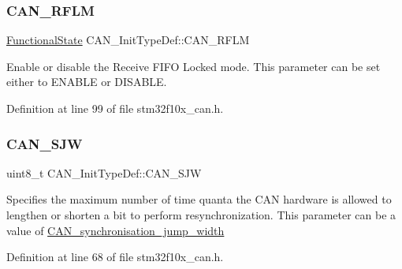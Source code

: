 \mbox{\label{struct_c_a_n___init_type_def_aa63787683c0ad533b513fb60355d76f1}} 
\subsubsection{\texorpdfstring{C\+A\+N\+\_\+\+R\+F\+LM}{CAN\_RFLM}}
{\footnotesize\ttfamily \hyperlink{group___exported__types_gac9a7e9a35d2513ec15c3b537aaa4fba1}{Functional\+State} C\+A\+N\+\_\+\+Init\+Type\+Def\+::\+C\+A\+N\+\_\+\+R\+F\+LM}

Enable or disable the Receive F\+I\+FO Locked mode. This parameter can be set either to E\+N\+A\+B\+LE or D\+I\+S\+A\+B\+LE. 

Definition at line 99 of file stm32f10x\+\_\+can.\+h.

\mbox{\label{struct_c_a_n___init_type_def_addac271c43490cb37ac7293f7bf201c2}} 
\subsubsection{\texorpdfstring{C\+A\+N\+\_\+\+S\+JW}{CAN\_SJW}}
{\footnotesize\ttfamily uint8\+\_\+t C\+A\+N\+\_\+\+Init\+Type\+Def\+::\+C\+A\+N\+\_\+\+S\+JW}

Specifies the maximum number of time quanta the C\+AN hardware is allowed to lengthen or shorten a bit to perform resynchronization. This parameter can be a value of \hyperlink{group___c_a_n__synchronisation__jump__width}{C\+A\+N\+\_\+synchronisation\+\_\+jump\+\_\+width} 

Definition at line 68 of file stm32f10x\+\_\+can.\+h.

\mbox{\label{struct_c_a_n___init_type_def_aa53ceafdcf1a9a5c9a6566006c9a4b60}} 
